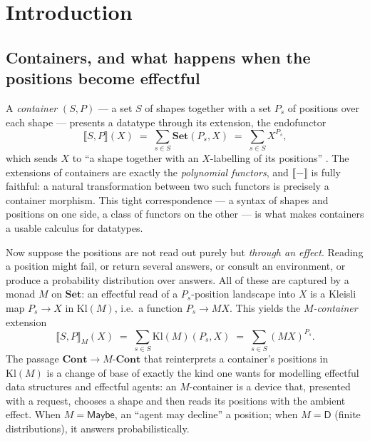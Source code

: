 \documentclass[11pt]{amsart}
\theoremstyle{plain}
\theoremstyle{definition}
\newcommand{\Set}{\mathbf{Set}}
\newcommand{\Cont}{\mathbf{Cont}}
\newcommand{\Kl}{\mathrm{Kl}}
\newcommand{\ext}[1]{\llbracket #1 \rrbracket}
\newcommand{\extM}[1]{\llbracket #1 \rrbracket_{M}}
\newcommand{\D}{\mathsf{D}}
\newcommand{\Maybe}{\mathsf{Maybe}}
\begin{document}
\section{Introduction}\label{sec:intro}

\subsection*{Containers, and what happens when the positions become effectful}
A \emph{container} $(S,P)$ --- a set $S$ of shapes together with a set $P_s$ of positions over
each shape --- presents a datatype through its extension, the endofunctor
\[
  \ext{S,P}(X)\;=\;\sum_{s\in S}\Set(P_s,X)\;=\;\sum_{s\in S}X^{P_s},
\]
which sends $X$ to ``a shape together with an $X$-labelling of its positions'' \cite{GambinoKock,NiuSpivak}.
The extensions of containers are exactly the \emph{polynomial functors}, and
$\ext{-}$ is fully faithful: a natural transformation between two such functors is precisely a
container morphism. This tight correspondence --- a syntax of shapes and positions on one side, a
class of functors on the other --- is what makes containers a usable calculus for datatypes.

Now suppose the positions are not read out purely but \emph{through an effect}. Reading a position
might fail, or return several answers, or consult an environment, or produce a probability
distribution over answers. All of these are captured by a monad $M$ on $\Set$: an effectful read
of a $P_s$-position landscape into $X$ is a Kleisli map $P_s\to X$ in $\Kl(M)$, i.e.\ a function
$P_s\to MX$. This yields the \emph{$M$-container} extension
\[
  \extM{S,P}(X)\;=\;\sum_{s\in S}\Kl(M)(P_s,X)\;=\;\sum_{s\in S}(MX)^{P_s}.
\]
The passage $\Cont\to M\text{-}\Cont$ that reinterprets a container's positions in $\Kl(M)$ is a
change of base of exactly the kind one wants for modelling effectful data structures and effectful
agents: an $M$-container is a device that, presented with a request, chooses a shape and then reads
its positions with the ambient effect. When $M=\Maybe$, an ``agent may decline'' a position; when
$M=\D$ (finite distributions), it answers probabilistically.
\end{document}
